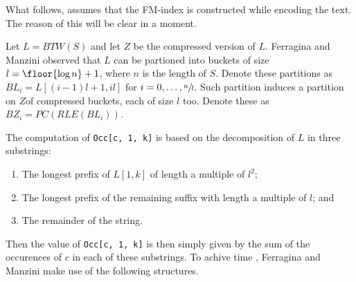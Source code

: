 \documentclass{subfiles}
\begin{document}
    What follows, assumes that the FM-index is constructed while encoding the text. 
        The reason of this will be clear in a moment.

    Let \(L = BTW(S)\) and let \(Z\)  be the compressed version of \(L\).
        Ferragina and Manzini observed that \(L\) can be partioned into buckets of size 
        \(l = \floor{\log n} + 1\), where \(n\) is the length of \(S\).
        Denote these partitions as \(BL_{i} = L[(i -1)l + 1, il]\) for \(i = 0, \ldots, \sfrac{n}{l}\). 
        Such partition induces a partition on \(Z\)\footnotemark of compressed buckets, 
        each of size \(l\) too. Denote these as \(BZ_{i} = PC(RLE(BL_{i}))\).

    The computation of \lstinline{Occ[c, 1, k]} is based on the decomposition of \(L\) in three substrings:
        \begin{enumerate}
            \item The longest prefix of \(L[1, k]\) of length a multiple of \(l^{2}\);
            \item The longest prefix of the remaining suffix with length a multiple of \(l\); and 
            \item The remainder of the string.
        \end{enumerate}
        Then the value of \lstinline{Occ[c, 1, k]} is then simply given by the sum of the occurences of
            \(c\) in each of these substrings. 
            To achive time , Ferragina and Manzini make use of the following structures. 
\end{document}
